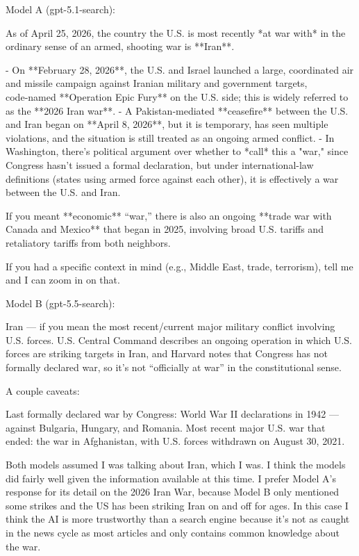 \documentclass[12pt]{article}
\begin{document}
\begin{llm}
Model A (gpt-5.1-search):

As of April 25, 2026, the country the U.S. is most recently *at war with* in the ordinary sense of an armed, shooting war is **Iran**.  

- On **February 28, 2026**, the U.S. and Israel launched a large, coordinated air and missile campaign against Iranian military and government targets, code‑named **Operation Epic Fury** on the U.S. side; this is widely referred to as the **2026 Iran war**.   
- A Pakistan‑mediated **ceasefire** between the U.S. and Iran began on **April 8, 2026**, but it is temporary, has seen multiple violations, and the situation is still treated as an ongoing armed conflict.   
- In Washington, there’s political argument over whether to *call* this a "war," since Congress hasn’t issued a formal declaration, but under international-law definitions (states using armed force against each other), it is effectively a war between the U.S. and Iran.   

If you meant **economic** “war,” there is also an ongoing **trade war with Canada and Mexico** that began in 2025, involving broad U.S. tariffs and retaliatory tariffs from both neighbors.   

If you had a specific context in mind (e.g., Middle East, trade, terrorism), tell me and I can zoom in on that.

Model B (gpt-5.5-search):

Iran — if you mean the most recent/current major military conflict involving U.S. forces. U.S. Central Command describes an ongoing operation in which U.S. forces are striking targets in Iran, and Harvard notes that Congress has not formally declared war, so it’s not “officially at war” in the constitutional sense.

A couple caveats:

    Last formally declared war by Congress: World War II declarations in 1942 — against Bulgaria, Hungary, and Romania.
    Most recent major U.S. war that ended: the war in Afghanistan, with U.S. forces withdrawn on August 30, 2021.

\end{llm}

Both models assumed I was talking about Iran, which I was. I think the models did fairly well given the information available at this time.
I prefer Model A's response for its detail on the 2026 Iran War, because Model B only mentioned some strikes and the US has been striking Iran 
on and off for ages. In this case I think the AI is more trustworthy than a search engine because it's not as caught in the news cycle
as most articles and only contains common knowledge about the war.
\end{document}
